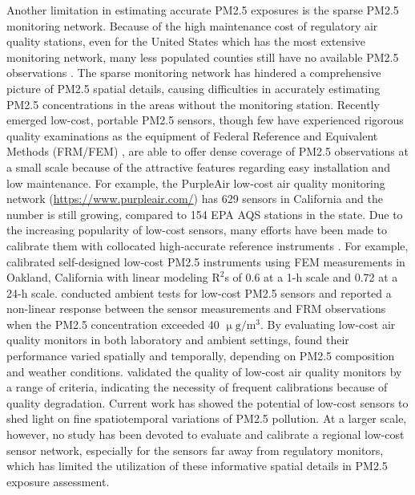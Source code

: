 \documentclass[11pt]{article}
\begin{document}
Another limitation in estimating accurate PM2.5 exposures is the sparse PM2.5 monitoring network. Because of the high maintenance cost of regulatory air quality stations, even for the United States which has the most extensive monitoring network, many less populated counties still have no available PM2.5 observations \citep{Wilson2002, Lee2011, Hu2014}. The sparse monitoring network has hindered a comprehensive picture of PM2.5 spatial details, causing difficulties in accurately estimating PM2.5 concentrations in the areas without the monitoring station. Recently emerged low-cost, portable PM2.5 sensors, though few have experienced rigorous quality examinations as the equipment of Federal Reference and Equivalent Methods (FRM/FEM) \citep{Noble2001}, are able to offer dense coverage of PM2.5 observations at a small scale because of the attractive features regarding easy installation and low maintenance. For example, the PurpleAir low-cost air quality monitoring network (\url{https://www.purpleair.com/}) has 629 sensors in California and the number is still growing, compared to 154 EPA AQS stations in the state. Due to the increasing popularity of low-cost sensors, many efforts have been made to calibrate them with collocated high-accurate reference instruments \citep{Holstius2014, Wang2015, Broday2017, Cao2017, Castell2017, Kelly2017}. For example, \citet{Holstius2014} calibrated self-designed low-cost PM2.5 instruments using FEM measurements in Oakland, California with linear modeling $\mathrm{R^2}$s of 0.6 at a 1-h scale and 0.72 at a 24-h scale. \citet{Kelly2017} conducted ambient tests for low-cost PM2.5 sensors and reported a non-linear response between the sensor measurements and FRM observations when the PM2.5 concentration exceeded 40 $\mathrm{\upmu g/m^3}$. By evaluating low-cost air quality monitors in both laboratory and ambient settings, \citet{Castell2017} found their performance varied spatially and temporally, depending on PM2.5 composition and weather conditions. \citet{Broday2017} validated the quality of low-cost air quality monitors by a range of criteria, indicating the necessity of frequent calibrations because of quality degradation. Current work has showed the potential of low-cost sensors to shed light on fine spatiotemporal variations of PM2.5 pollution. At a larger scale, however, no study has been devoted to evaluate and calibrate a regional low-cost sensor network, especially for the sensors far away from regulatory monitors, which has limited the utilization of these informative spatial details in PM2.5 exposure assessment. 
\end{document}
